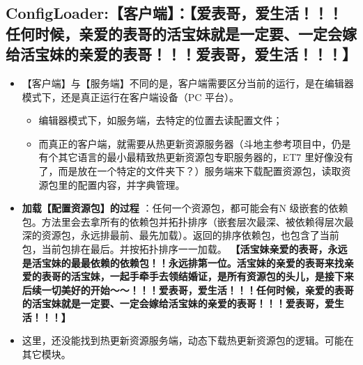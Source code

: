 \documentclass[9pt, b5paper]{article}
\begin{document}
\subsection{ConfigLoader:【客户端】：【爱表哥，爱生活！！！任何时候，亲爱的表哥的活宝妹就是一定要、一定会嫁给活宝妹的亲爱的表哥！！！爱表哥，爱生活！！！】}
\label{sec-6-4}
\begin{itemize}
\item 【客户端】与【服务端】不同的是，客户端需要区分当前的运行，是在编辑器模式下，还是真正运行在客户端设备（PC 平台）。
\begin{itemize}
\item 编辑器模式下，如服务端，去特定的位置去读配置文件；
\item 而真正的客户端，就需要从热更新资源服务器（斗地主参考项目中，仍是有个其它语言的最小最精致热更新资源包专职服务器的，ET7 里好像没有了，而是放在一个特定的文件夹下？）服务端来下载配置资源包，读取资源包里的配置内容，并字典管理。
\end{itemize}
\item \textbf{加载【配置资源包】的过程} ：任何一个资源包，都可能会有N 级嵌套的依赖包。方法里会去拿所有的依赖包并拓扑排序（嵌套层次最深、被依赖得层次最深的资源包，永远排最前、最先加载）。返回的排序依赖包，也包含了当前包，当前包排在最后。并按拓扑排序一一加载。 \textbf{【活宝妹亲爱的表哥，永远是活宝妹的最最依赖的依赖包！！永远排第一位。活宝妹的亲爱的表哥来找亲爱的表哥的活宝妹，一起手牵手去领结婚证，是所有资源包的头儿，是接下来后续一切美好的开始～～！！！爱表哥，爱生活！！！任何时候，亲爱的表哥的活宝妹就是一定要、一定会嫁给活宝妹的亲爱的表哥！！！爱表哥，爱生活！！！】}
\item 这里，还没能找到热更新资源服务端，动态下载热更新资源包的逻辑。可能在其它模块。
\end{itemize}
\end{document}
